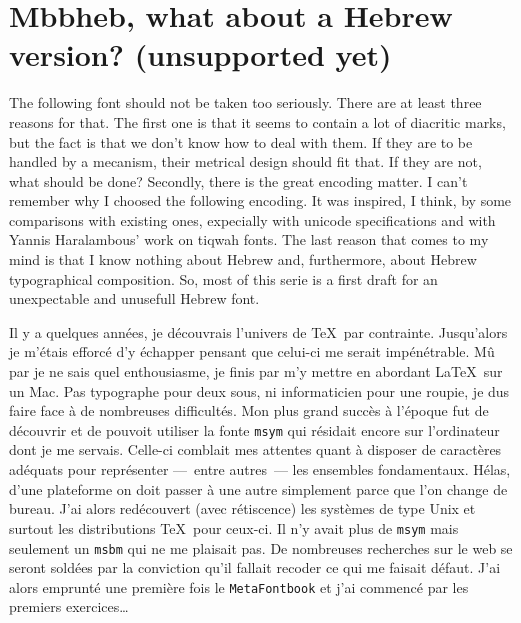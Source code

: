 
\section{Mbbheb, what about a Hebrew version? (unsupported yet)}

The following font should not be taken too seriously.
There are at least three reasons for that.
The first one is that it seems to contain a lot of
diacritic marks, but the fact is that we don't know
how to deal with them. If they are to be handled by
a \cs{\accent} mecanism, their metrical design
should fit that. If they are not, what should be done?
Secondly, there is the great encoding matter. I can't remember
why I choosed the following encoding. It was inspired,
I think, by some comparisons with existing ones, expecially
with unicode specifications and with Yannis Haralambous' work
on tiqwah fonts. The last reason that comes to my mind
is that I know nothing about Hebrew and, furthermore,
about Hebrew typographical composition.
So, most of this serie is a first draft for an unexpectable
and unusefull Hebrew font.

\bye


Il y a quelques ann\'ees, je d\'ecouvrais l'univers
de \TeX\ par contrainte. Jusqu'alors je m'\'etais
efforc\'e d'y \'echapper pensant que celui-ci me
serait imp\'en\'etrable. M\^u par je ne sais quel
enthousiasme, je finis par m'y mettre en abordant
La\TeX\ sur un Mac. Pas typographe pour deux sous,
ni informaticien pour une roupie, je dus faire face
\`a de nombreuses difficult\'es. Mon plus grand
succ\`es \`a l'\'epoque fut de d\'ecouvrir et de
pouvoit utiliser la fonte {\tt msym} qui r\'esidait
encore sur l'ordinateur dont je me servais. Celle-ci
comblait mes attentes quant \`a disposer de caract\`eres
ad\'equats pour repr\'esenter ---~entre autres~---
les ensembles fondamentaux. H\'elas, d'une plateforme
on doit passer \`a une autre simplement parce que
l'on change de bureau. J'ai alors red\'ecouvert (avec
r\'etiscence) les syst\`emes de type Unix et surtout
les distributions \TeX\ pour ceux-ci. Il n'y avait
plus de {\tt msym} mais seulement un {\tt msbm} qui ne
me plaisait pas. De nombreuses recherches sur le web
se seront sold\'ees par la conviction qu'il fallait
recoder ce qui me faisait d\'efaut. J'ai alors
emprunt\'e une premi\`ere fois le {\tt MetaFontbook}
et j'ai commenc\'e par les premiers exercices\dots
